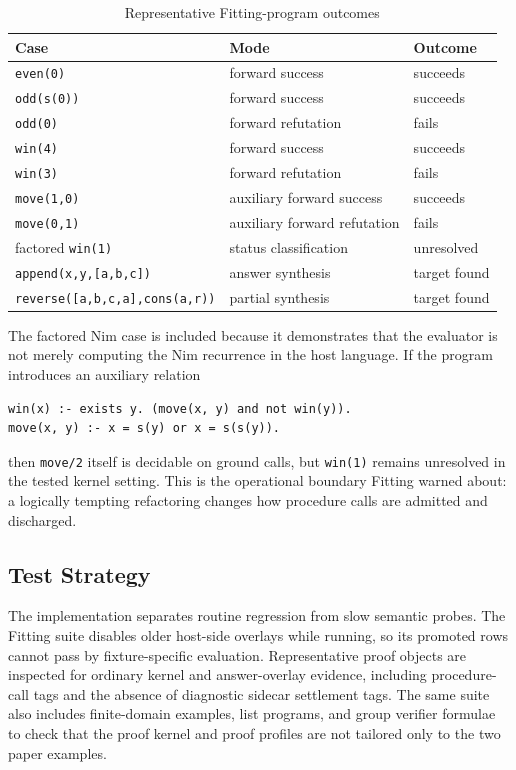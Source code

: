 \documentclass[acmsmall,screen,review,anonymous]{acmart}
\begin{document}
\begin{table}[h]
  \caption{Representative Fitting-program outcomes}
  \label{tab:fitting-results}
  \begin{tabular}{lll}
    \toprule
    Case & Mode & Outcome \\
    \midrule
    \texttt{even(0)} & forward success & succeeds \\
    \texttt{odd(s(0))} & forward success & succeeds \\
    \texttt{odd(0)} & forward refutation & fails \\
    \texttt{win(4)} & forward success & succeeds \\
    \texttt{win(3)} & forward refutation & fails \\
    \texttt{move(1,0)} & auxiliary forward success & succeeds \\
    \texttt{move(0,1)} & auxiliary forward refutation & fails \\
    factored \texttt{win(1)} & status classification & unresolved \\
    \texttt{append(x,y,[a,b,c])} & answer synthesis & target found \\
    \texttt{reverse([a,b,c,a],cons(a,r))} & partial synthesis & target found \\
    \bottomrule
  \end{tabular}
\end{table}

The factored Nim case is included because it demonstrates that the evaluator is
not merely computing the Nim recurrence in the host language.  If the program
introduces an auxiliary relation

\begin{verbatim}
win(x) :- exists y. (move(x, y) and not win(y)).
move(x, y) :- x = s(y) or x = s(s(y)).
\end{verbatim}

then \texttt{move/2} itself is decidable on ground calls, but \texttt{win(1)}
remains unresolved in the tested kernel setting.  This is the operational
boundary Fitting warned about: a logically tempting refactoring changes how
procedure calls are admitted and discharged.

\subsection{Test Strategy}

The implementation separates routine regression from slow semantic probes.  The
Fitting suite disables older host-side overlays while running, so its promoted
rows cannot pass by fixture-specific evaluation.  Representative proof objects
are inspected for ordinary kernel and answer-overlay evidence, including
procedure-call tags and the absence of diagnostic sidecar settlement tags.  The
same suite also includes finite-domain examples, list programs, and group
verifier formulae to check that the proof kernel and proof profiles are not
tailored only to the two paper examples.
\end{document}
